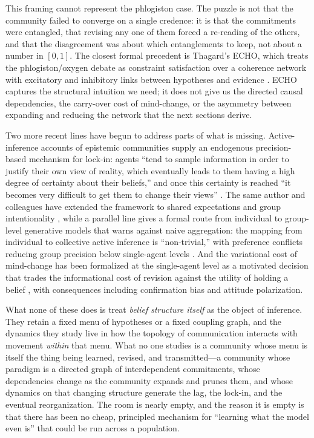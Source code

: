 This framing cannot represent the phlogiston case. The puzzle is not that the
community failed to converge on a single credence: it is that the commitments
were entangled, that revising any one of them forced a re-reading of the
others, and that the disagreement was about which entanglements to keep, not
about a number in $[0,1]$. The closest formal precedent is Thagard's ECHO,
which treats the phlogiston/oxygen debate as constraint satisfaction over a
coherence network with excitatory and inhibitory links between hypotheses and
evidence \citep{thagard1989,thagard1990}. ECHO captures the structural
intuition we need; it does not give us the directed causal dependencies, the
carry-over cost of mind-change, or the asymmetry between expanding and
reducing the network that the next sections derive.

Two more recent lines have begun to address parts of what is missing.
Active-inference accounts of epistemic communities supply an endogenous
precision-based mechanism for lock-in: agents ``tend to sample information in
order to justify their own view of reality, which eventually leads to them
having a high degree of certainty about their beliefs,'' and once this
certainty is reached ``it becomes very difficult to get them to change their
views'' \citep{albarracin2022}. The same author and colleagues have extended
the framework to shared expectations and group intentionality
\citep{albarracin2024protentions}, while a parallel line gives a formal route
from individual to group-level generative models that warns against naive
aggregation: the mapping from individual to collective active inference is
``non-trivial,'' with preference conflicts reducing group precision below
single-agent levels \citep{friston2023federated,tschantz2025}. And the
variational cost of mind-change has been formalized at the single-agent level
as a motivated decision that trades the informational cost of revision against
the utility of holding a belief \citep{hyland2025}, with consequences
including confirmation bias and attitude polarization.

What none of these does is treat \emph{belief structure itself} as the object
of inference. They retain a fixed menu of hypotheses or a fixed coupling
graph, and the dynamics they study live in how the topology of communication
interacts with movement \emph{within} that menu. What no one studies is a
community whose menu is itself the thing being learned, revised, and
transmitted---a community whose paradigm is a directed graph of
interdependent commitments, whose dependencies change as the community
expands and prunes them, and whose dynamics on that changing structure
generate the lag, the lock-in, and the eventual reorganization. The room is
nearly empty, and the reason it is empty is that there has been no cheap,
principled mechanism for ``learning what the model even is'' that could be
run across a population.

